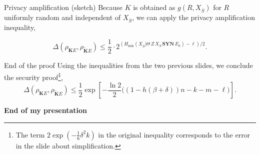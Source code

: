 \documentclass{beamer}
\begin{document}
\begin{frame}{Privacy amplification (sketch)}
Because $K$ is obtained as $g(R, X_{\overline{S}})$ for $R$ uniformly random and independent of $X_{\overline{S}}$, we can apply the privacy amplification inequality, 

$$
\Delta\left(\rho_{\mathbf{K}E}, \rho_{\mathbf{\tilde{K}}E} \right) \leq \frac{1}{2}\cdot 2^{\left(H_{\min}(X_{\overline{S}}|\Theta \, Z \, X_S \, \textbf{SYN} \, E_0) - \ell \right)/2}.
$$
\end{frame}

\begin{frame}{End of the proof}
Using the inequalities from the two previous slides, we conclude the security proof\footnote{The term $2\exp\left(- \frac{1}{6}\delta^2 k \right)$ in the original inequality corresponds to the error in the slide about simplification.},
$$\Delta\left(\rho_{\mathbf{K}E}, \rho_{\mathbf{\tilde{K}}E} \right) \leq \frac{1}{2} \exp\left[ -\frac{\ln 2}{2} \bigg( (1 - h(\beta+\delta))n - k - m - \ell \bigg) \right].$$
\end{frame}


\begin{frame}
\begin{center}
\Large{\textbf{End of my presentation} }
\end{center}
\end{frame}
\end{document}
